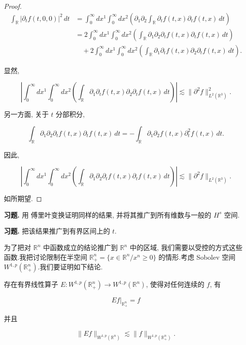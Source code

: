 \begin{proof}

\[
\begin{aligned}
\int_{\mathbb{R}}|\partial_t f(t, 0, 0)|^2\, dt &= \int_0^\infty dx^1\int_0^\infty dx^2\left(\partial_1\partial_2\int_{\mathbb{R}}\partial_t f(t, x)\partial_t f(t, x)\, dt\right) \\
&= 2\int_0^\infty dx^1\int_0^\infty dx^2\left(\int_{\mathbb{R}}\partial_1\partial_2\partial_t f(t, x)\partial_t f(t, x)\, dt\right) \\
&\quad + 2\int_0^\infty dx^1\int_0^\infty dx^2\left(\int_{\mathbb{R}}\partial_1\partial_t f(t, x)\partial_2\partial_t f(t, x)\, dt\right).
\end{aligned}
\]

显然,

\[
\left|\int_0^\infty dx^1\int_0^\infty dx^2\left(\int_{\mathbb{R}}\partial_1\partial_t f(t, x)\partial_2\partial_t f(t, x)\, dt\right)\right| \lesssim \|\partial^2 f\|_{L^2(\mathbb{R}^3)}^2.
\]

另一方面, 关于 $t$ 分部积分,

\[
\int_{\mathbb{R}}\partial_1\partial_2\partial_t f(t, x)\partial_t f(t, x)\, dt = -\int_{\mathbb{R}}\partial_1\partial_2 f(t, x)\partial_t^2 f(t, x)\, dt.
\]

因此,

\[
\left|\int_0^\infty dx^1\int_0^\infty dx^2\left(\int_{\mathbb{R}}\partial_1\partial_2\partial_t f(t, x)\partial_t f(t, x)\, dt\right)\right| \lesssim \|\partial^2 f\|_{L^2(\mathbb{R}^3)}.
\]

如所期望.
\end{proof}

\textbf{习题.} 用 傅里叶变换证明同样的结果, 并将其推广到所有维数与一般的 $H^s$ 空间.

\textbf{习题.} 把该结果推广到有界区间上的 $t$.


为了把对 $\mathbb{R}^n$ 中函数成立的结论推广到 $\mathbb{R}^n$ 中的区域, 我们需要以受控的方式这些函数.我把讨论限制在半空间 $\mathbb{R}_+^n = \{x\in\mathbb{R}^n / x^n\ge 0\}$ 的情形.考虑 Sobolev 空间 $W^{1, p}(\mathbb{R}_+^n)$.我们要证明如下结论.

\begin{proposition}\label{prop:c6-2.27}
存在有界线性算子 $E : W^{1, p}(\mathbb{R}_+^n)\to W^{1, p}(\mathbb{R}^n)$, 使得对任何连续的 $f$, 有

\[
Ef|_{\mathbb{R}_+^n} = f
\]

并且

\[
\|Ef\|_{W^{1, p}(\mathbb{R}^n)} \lesssim \|f\|_{W^{1, p}(\mathbb{R}_+^n)}.
\]
\end{proposition}

